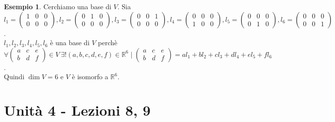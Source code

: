 \documentclass[a4paper]{article}
\theoremstyle{definition}
\newtheorem*{es}{Esempio}
\begin{document}
\begin{es}
	Cerchiamo una base di $V$. Sia $l_1 = \begin{pmatrix} 1 & 0 & 0 \\ 0 & 0 & 0 \end{pmatrix}, l_2 = \begin{pmatrix} 0 & 1 & 0 \\ 0 & 0 & 0 \end{pmatrix}, l_3 = \begin{pmatrix} 0 & 0 & 1 \\ 0 & 0 & 0 \end{pmatrix}, l_4 = \begin{pmatrix} 0 & 0 & 0 \\ 1 & 0 & 0 \end{pmatrix}, l_5 = \begin{pmatrix} 0 & 0 & 0 \\ 0 & 1 & 0 \end{pmatrix}, l_6 = \begin{pmatrix} 0 & 0 & 0 \\ 0 & 0 & 1 \end{pmatrix}$. \\
	$l_1, l_2, l_3, l_4, l_5, l_6$ è una base di $V$ perchè $\forall \begin{pmatrix}
			a & c & e \\
			b & d & f
		\end{pmatrix} \in V \ \exists! (a, b, c, d, e, f) \in \mathbb{R}^6 \mid \begin{pmatrix}
			a & c & e \\
			b & d & f
		\end{pmatrix} = al_1 + bl_2 + cl_3 + dl_4 + el_5 + fl_6$. \\
	Quindi $\dim V = 6$ e $V$ è isomorfo a $\mathbb{R}^6$.
\end{es}
\section{Unità 4 - Lezioni 8, 9}
\end{document}
